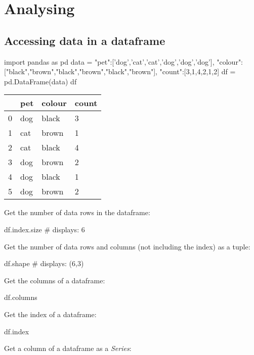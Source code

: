 \chapter{Analysing}
\label{chapter:analysing}

\section{Accessing data in a dataframe}

\begin{pycode}
    import pandas as pd
    data = {"pet":['dog','cat','cat','dog','dog','dog'],
    "colour":["black","brown","black","brown","black","brown"],
    "count":[3,1,4,2,1,2]}
    df = pd.DataFrame(data)
    df
\end{pycode}

\begin{tabular}{l l l l}
      & pet & colour & count \\
    \hline
    0 & dog & black  & 3     \\
    1 & cat & brown  & 1     \\
    2 & cat & black  & 4     \\
    3 & dog & brown  & 2     \\
    4 & dog & black  & 1     \\
    5 & dog & brown  & 2     \\
\end{tabular}

Get the number of data rows in the dataframe:

\begin{pycode}
    df.index.size
    # displays: 6
\end{pycode}

Get the number of data rows and columns (not including the index) as a tuple:

\begin{pycode}
    df.shape
    # displays: (6,3)
\end{pycode}

Get the columns of a dataframe:

\begin{pycode}
    df.columns
\end{pycode}

Get the index of a dataframe:

\begin{pycode}
    df.index
\end{pycode}

Get a column of a dataframe as a \textit{Series}:

